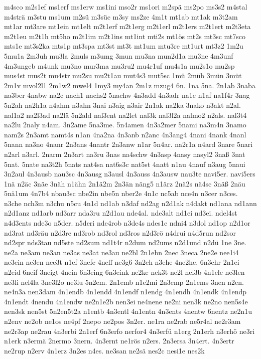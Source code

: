 {m4sco
m2s1ef
ms1erf
ms1erw
ms1ini
mso2r
ms1ori
m2spä
ms2po
ms3s2
m4stal
m4strä
m3stu
ms1um
m2sü
m3süc
m3sy
ms2ze
4m1t
mt1ab
mt1ak
m3t2am
mt1ar
mt3are
mt1ein
mt1elt
m2t1erf
m2t1erg
m2t1erl
m2t1ers
m2t1ert
m2t3eta
m2t1eu
m2t1h
mt5ho
m2t1im
m2t1ins
mt1int
mti2s
mt1ös
mt2s
mt3sc
mt7sco
mts1e
mt3s2ka
mts1p
mt3spa
mt3st
mt3t
mt1um
mtu3re
mt1urt
mt3z2
1m2u
5mu1a
2m3uh
mu3la
2muls
m3umg
3mun
mu3na
mun2d1a
mu3ne
4m3unf
4m3ungeb
m4unk
mu3no
mur3ma
mu3ru2
mu4r1uf
mu4s1a
mu2s1o
mu2sp
mus4st
mus2t
mu4str
mu2su
mu2t1au
mut4s3
mut5sc
1mü
2müb
3mün
3müt
2m1v
mvol2l1
2m1w2
mwel4
1my3
my4an
2m1z
mzug4
6n.
1na
5na.
2n1ab
3naba
na3ber
4nabw
na2c
nach1
nachs2
5nachw
4n3add
4n3adr
na1e
n1af
na1f4r
3nag
5n2ah
na2h1a
n4ahm
n3ahn
3nai
n3aig
n3air
2n1ak
na2ka
3nako
n3akt
n2al.
nal1a2
na2l3ad
na2lä
5n2ald
nal3ent
na2let
nal3k
nal3l2a
nalmo2
n2als.
nal3t4
na2lu
2naly
n4am.
3n2ame
5na3me.
5n4amen
4n3a2mer
5nami
na3m4n
3namo
nam2s
2n3amt
namt4s
n1an
4na2na
4n3anb
n2anc
4n3ang4
4nani
4nank
4nanl
5nann
na3no
4nanr
2n3ans
4nantr
2n3anw
n1ar
5n4ar.
na2r1a
n4ard
3nare
5nari
n2arl
n3arl.
2narm
2n3art
na3ru
3nas
na4schw
4n3asp
4nasy
nasyl2
3naß
3nat
5nat.
5nate
na3t2h
5nats
nat4sa
nat6s3c
nat5st
4natt
n1au
4nauf
n3aug
5naui
3n2aul
4n3ausb
nau3sc
4n3ausg
n3ausl
4n3auss
4n3ausw
nau3te
navi5er.
navi5ers
1nä
n2äc
3näe
3näh
n1ähn
2n1ä2m
2n3än
näng5
n1ärz
2nä2s
nä4sc
3näß
2näu
5nä1um
4n7b4
nbau3sc
nbe2in
nbe5n
nber2e
4n1c
nc5ab
nce4n
n3cer
n3ces.
n3che
nch3m
n3chu
n5cu
4n1d
nd1ab
n3daf
nd2ag
n2d1ak
n4dakt
nd1ana
nd1ann
n2d1anz
nd1arb
nd3arr
nda3ru
n2d1au
nde4al.
nde3alt
nd1ei
nd3ei.
ndel4st
n4d3ents
nde3o
n5der.
n5deri
nde4rob
n3de4s
ndes1e
ndni4
n3dol
nd1op
n2d1or
nd3rat
nd3räu
n2d3re
nd3rob
nd3rol
nd3ros
n2d3rö
n4drui
n4d5run
nd2sor
nd2spr
nds3tau
nd5ste
nd2sum
nd1t4r
n2dum
nd2ums
n2d1und
n2dü
1ne
3ne.
ne2a
ne3am
ne3an
ne3as
ne3at
ne3au
ne2bl
2n1ebn
2nec
3neca
2ne2e
nee1i4
ne3ein
ne3en
nee3t
n1ef
3nefe
4neff
ne3g6
3n2eh
n3ehe
4ne2he.
6n3ehr
2n1ei
n2eid
6neif
3neigt
4nein
6n3eing
6n3eink
ne2ke
nek3t
ne2l
nel3b
4n1ele
ne3len
ne3li
nel4la
3ne3l2o
ne3lu
5n2em.
2n1emb
n1e2mi
2n3emp
2n1ems
3nen
n2en.
ne4n3a
nen3dam
4n1endb
4n1endd
4n1endf
n1endg
4n1endh
4n1endk
4n1endp
4n1endt
4nendu
4n1endw
ne2n1e2b
nen3ei
ne4nene
ne2ni
nen3k
ne2no
nen5s4e
nen3sk
nen5st
5n2en5t2a
n1entb
4n3entl
4n1entn
4n3ents
4nentw
6nentz
ne2n1u
n2env
ne2ob
ne1os
ne4pf
2nepo
ne2pos
3n2er.
ne1ra
ne2rab
ne5r4al
ne2r3am
ne2r3ap
ne2rau
4n3erbi
2n1erf
6n3erfo
nerfor4
4n3erfü
n1erg
2n1erh
n3erhö
ne3ri
n1erk
n3ermä
2nermo
3nern.
4n3ernt
ne1rös
n2ers.
2n3ersa
3n4ert.
4n3ertr
ne2rup
n2erv
4n1erz
3n2es
n4es.
ne3san
ne2sä
nes2c
nesi1e
nes2k
}
